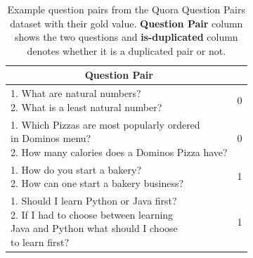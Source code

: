 \begin{enumerate}
    \begin{table}[ht!]
 	\centering 	
 	\begin{tabular}{l|c} 
 		\hline
 		\multicolumn{1}{c|}{\textbf{Question Pair}} & 
 		\multicolumn{1}{c}{\textbf{\detokenize{is-duplicate}}}  \\
 		\hline
 		\makecell[l]
 		{	1. What are natural numbers? \\ 
 			2. What is a least natural number?} & 0  \\
 		\hline
 		\makecell[l]
 		{	1. Which Pizzas are most popularly ordered \\ in Dominos menu? \\ 
 			2. How many calories does a Dominos Pizza have?} & 0  \\
 		\hline
 		\makecell[l]
 		{   1. How do you start a bakery? \\ 
 			2. How can one start a bakery business?} & 1  \\
 		\hline
 		\makecell[l]
 		{	1. Should I learn Python or Java first? \\ 
 			2. If I had to choose between learning \\ Java and Python what should I choose \\ to learn first?} & 1  \\
 		\hline
 		
 	\end{tabular}
 	\caption[Example question pairs from the Quora Question Pairs dataset]{Example question  pairs from the Quora Question Pairs dataset with their gold  value. \textbf{Question Pair} column shows the two questions and \textbf{is-duplicated} column denotes whether it is a duplicated pair or not.}
 	\label{tab:quoradata}
 \end{table}  



\end{enumerate}
